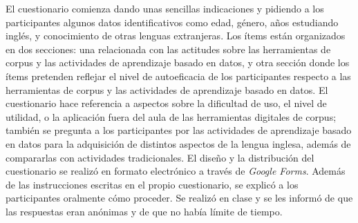 El cuestionario comienza dando unas sencillas indicaciones y pidiendo a
los participantes algunos datos identificativos como edad, género, años
estudiando inglés, y conocimiento de otras lenguas extranjeras. Los
ítems están organizados en dos secciones: una relacionada con las
actitudes sobre las herramientas de corpus y las actividades de
aprendizaje basado en datos, y otra sección donde los ítems pretenden
reflejar el nivel de autoeficacia de los participantes respecto a las
herramientas de corpus y las actividades de aprendizaje basado en datos.
El cuestionario hace referencia a aspectos sobre la dificultad de uso,
el nivel de utilidad, o la aplicación fuera del aula de las herramientas
digitales de corpus; también se pregunta a los participantes por las
actividades de aprendizaje basado en datos para la adquisición de
distintos aspectos de la lengua inglesa, además de compararlas con
actividades tradicionales. El diseño y la distribución del cuestionario
se realizó en formato electrónico a través de \emph{Google Forms}.
Además de las instrucciones escritas en el propio cuestionario, se
explicó a los participantes oralmente cómo proceder. Se realizó en clase
y se les informó de que las respuestas eran anónimas y de que no había
límite de tiempo.
